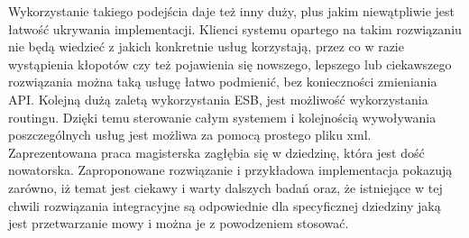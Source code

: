 Wykorzystanie takiego podejścia daje też inny duży, plus jakim niewątpliwie jest łatwość ukrywania implementacji. Klienci systemu opartego na takim rozwiązaniu nie będą wiedzieć z jakich konkretnie usług korzystają, przez co w razie wystąpienia kłopotów czy też pojawienia się nowszego, lepszego lub ciekawszego rozwiązania można taką usługę łatwo podmienić, bez konieczności zmieniania API. Kolejną dużą zaletą wykorzystania ESB, jest możliwość wykorzystania routingu. Dzięki temu sterowanie całym systemem i kolejnością wywoływania poszczególnych usług jest możliwa za pomocą prostego pliku xml.  \\
Zaprezentowana praca magisterska zagłębia się w dziedzinę, która jest dość nowatorska. Zaproponowane rozwiązanie i przykładowa implementacja pokazują zarówno, iż temat jest ciekawy i warty dalszych badań oraz, że istniejące w tej chwili rozwiązania integracyjne są odpowiednie dla specyficznej dziedziny jaką jest przetwarzanie mowy i można je z powodzeniem stosować. 







